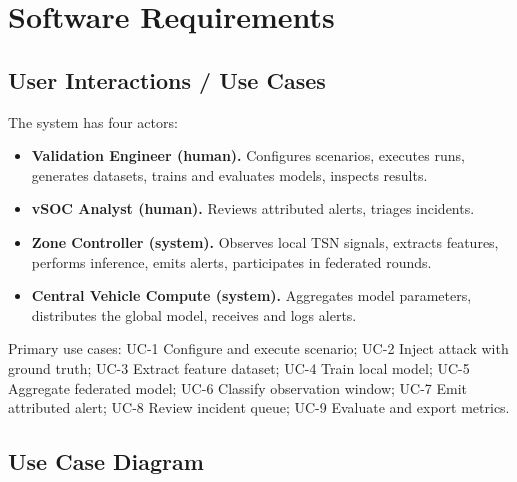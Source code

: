 \chapter{Software Requirements}
\label{ch:requirements}

\section{User Interactions / Use Cases}

The system has four actors:

\begin{itemize}
  \item \textbf{Validation Engineer (human).} Configures scenarios, executes runs,
        generates datasets, trains and evaluates models, inspects results.
  \item \textbf{vSOC Analyst (human).} Reviews attributed alerts, triages incidents.
  \item \textbf{Zone Controller (system).} Observes local TSN signals, extracts
        features, performs inference, emits alerts, participates in federated rounds.
  \item \textbf{Central Vehicle Compute (system).} Aggregates model parameters,
        distributes the global model, receives and logs alerts.
\end{itemize}

Primary use cases: UC-1 Configure and execute scenario; UC-2 Inject attack with
ground truth; UC-3 Extract feature dataset; UC-4 Train local model; UC-5 Aggregate
federated model; UC-6 Classify observation window; UC-7 Emit attributed alert;
UC-8 Review incident queue; UC-9 Evaluate and export metrics.

\section{Use Case Diagram}

